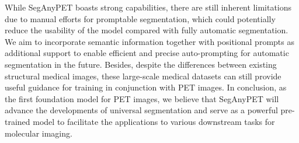 While SegAnyPET boasts strong capabilities, there are still inherent limitations due to manual efforts for promptable segmentation, which could potentially reduce the usability of the model compared with fully automatic segmentation. 
We aim to incorporate semantic information together with positional prompts as additional support to enable efficient and precise auto-prompting for automatic segmentation in the future.
Besides, despite the differences between existing structural medical images, these large-scale medical datasets \cite{bai2024m3d} can still provide useful guidance for training in conjunction with PET images.
In conclusion, as the first foundation model for PET images, we believe that SegAnyPET will advance the developments of universal segmentation and serve as a powerful pre-trained model to facilitate the applications to various downstream tasks for molecular imaging.



